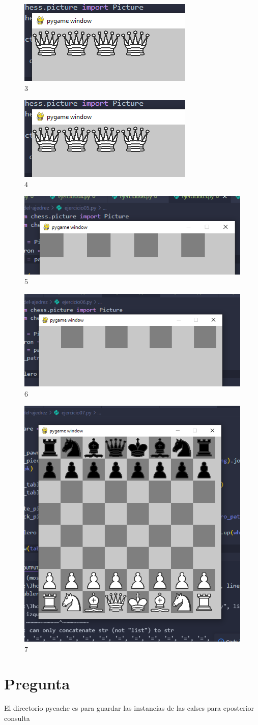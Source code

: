 \begin{figure}
    \centering
    \includegraphics[width=0.5\linewidth]{3.png}
    \caption{3}
    \label{fig:enter-label}
\end{figure}

\begin{figure}
    \centering
    \includegraphics[width=0.5\linewidth]{4.png}
    \caption{4}
    \label{fig:enter-label}
\end{figure}

\begin{figure}
    \centering
    \includegraphics[width=0.5\linewidth]{5.png}
    \caption{5}
    \label{fig:enter-label}
\end{figure}

\begin{figure}
    \centering
    \includegraphics[width=0.5\linewidth]{6.png}
    \caption{6}
    \label{fig:enter-label}
\end{figure}

\begin{figure}
    \centering
    \includegraphics[width=0.5\linewidth]{7.png}
    \caption{7}
    \label{fig:enter-label}
\end{figure}

\section{Pregunta}
El directorio pycache es para guardar las instancias de las calses para cposterior consulta